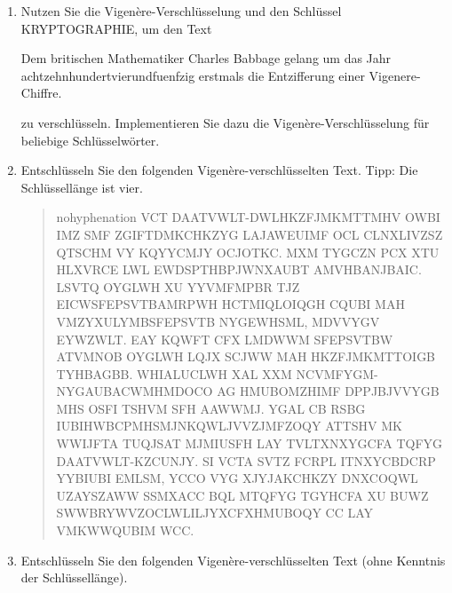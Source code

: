 \documentclass[german]{mhexsheet}
\begin{document}
\begin{exercise}[title=Vigenère-Verschlüsselung]
 \begin{enumerate}
  \item Nutzen Sie die Vigenère-Verschlüsselung und den Schlüssel \textsf{KRYPTOGRAPHIE}, um den Text
  
  \textsf{Dem britischen Mathematiker Charles Babbage gelang um das Jahr achtzehnhundertvierundfuenfzig erstmals die Entzifferung einer Vigenere-Chiffre.} 
  
  zu verschlüsseln. Implementieren Sie dazu die Vigenère-Verschlüsselung für beliebige Schlüsselwörter.
  \item Entschlüsseln Sie den folgenden Vigenère-verschlüsselten Text. Tipp: Die Schlüssellänge ist vier.
  
  \begin{quote}\small\begin{sloppypar}\begin{hyphenrules}{nohyphenation}
  \textsf{VCT DAATVWLT-DWLHKZFJMKMTTMHV OWBI IMZ SMF ZGIFTDMKCHKZYG LAJAWEUIMF OCL CLNXLIVZSZ QTSCHM VY KQYYCMJY OCJOTKC. MXM TYGCZN PCX XTU HLXVRCE LWL EWDSPTHBPJWNXAUBT AMVHBANJBAIC. LSVTQ OYGLWH XU YYVMFMPBR TJZ EICWSFEPSVTBAMRPWH HCTMIQLOIQGH CQUBI MAH VMZYXULYMBSFEPSVTB NYGEWHSML, MDVVYGV EYWZWLT. EAY KQWFT CFX LMDWWM SFEPSVTBW ATVMNOB OYGLWH LQJX SCJWW MAH HKZFJMKMTTOIGB TYHBAGBB. WHIALUCLWH XAL XXM NCVMFYGM-NYGAUBACWMHMDOCO AG HMUBOMZHIMF DPPJBJVVYGB MHS OSFI TSHVM SFH AAWWMJ. YGAL CB RSBG IUBIHWBCPMHSMJNKQWLJVVZJMFZOQY ATTSHV MK WWIJFTA TUQJSAT MJMIUSFH LAY TVLTXNXYGCFA TQFYG DAATVWLT-KZCUNJY. SI VCTA SVTZ FCRPL ITNXYCBDCRP YYBIUBI EMLSM, YCCO VYG XJYJAKCHKZY DNXCOQWL UZAYSZAWW SSMXACC BQL MTQFYG TGYHCFA XU BUWZ SWWBRYWVZOCLWLILJYXCFXHMUBOQY CC LAY VMKWWQUBIM WCC.}
  \end{hyphenrules}\end{sloppypar}\end{quote}

  \item Entschlüsseln Sie den folgenden Vigenère-verschlüsselten Text (ohne Kenntnis der Schlüssellänge).
  

\end{enumerate}
\end{exercise}
\end{document}
